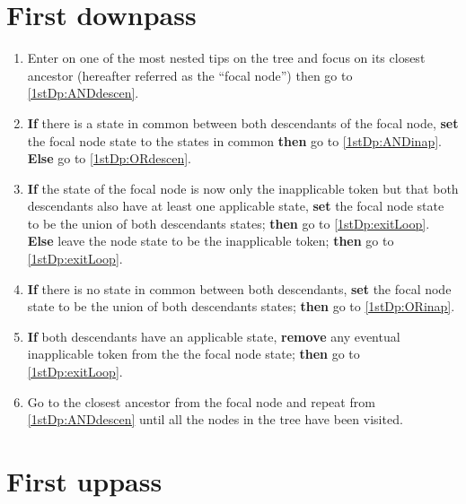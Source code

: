 \documentclass[a4paper,12pt]{article}
\begin{document}


\section{First downpass} \label{1stDp}

\begin{enumerate}
    \item Enter on one of the most nested tips on the tree and focus on its closest ancestor (hereafter referred as the ``focal node'') then go to \ref{1stDp:ANDdescen}.
    \item \label{1stDp:ANDdescen} \textbf{If} there is a state in common between both descendants of the focal node, \textbf{set} the focal node state to the states in common \textbf{then} go to \ref{1stDp:ANDinap}. \textbf{Else} go to \ref{1stDp:ORdescen}.
    \item \label{1stDp:ANDinap} \textbf{If} the state of the focal node is now only the inapplicable token but that both descendants also have at least one applicable state, \textbf{set} the focal node state to be the union of both descendants states; \textbf{then} go to \ref{1stDp:exitLoop}. \textbf{Else} leave the node state to be the inapplicable token; \textbf{then} go to \ref{1stDp:exitLoop}.
    \item \label{1stDp:ORdescen} \textbf{If} there is no state in common between both descendants, \textbf{set} the focal node state to be the union of both descendants states; \textbf{then} go to \ref{1stDp:ORinap}.
    \item \label{1stDp:ORinap} \textbf{If} both descendants have an applicable state, \textbf{remove} any eventual inapplicable token from the the focal node state; \textbf{then} go to \ref{1stDp:exitLoop}.
    \item \label{1stDp:exitLoop} Go to the closest ancestor from the focal node and repeat from \ref{1stDp:ANDdescen} until all the nodes in the tree have been visited.
\end{enumerate}

\section{First uppass} \label{1stUp}
\end{document}
